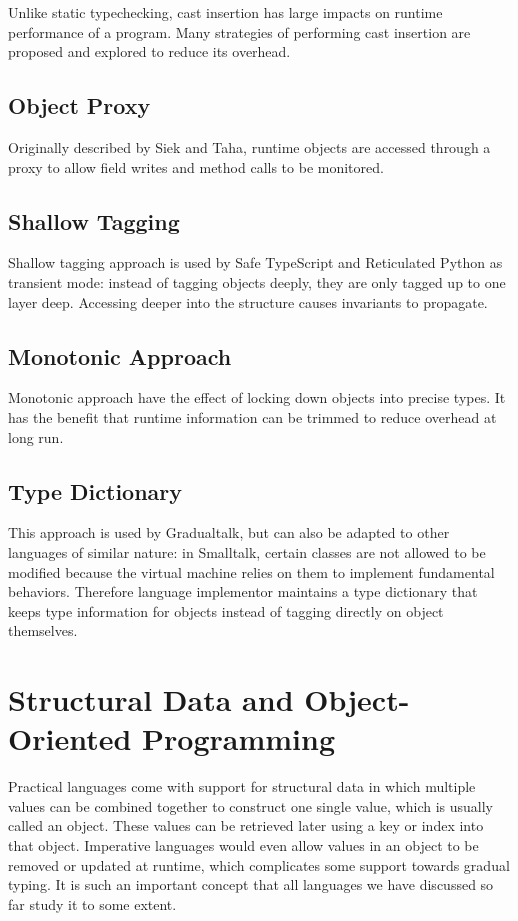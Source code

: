 Unlike static typechecking, cast insertion has large impacts on runtime performance of a program.
Many strategies of performing cast insertion are proposed and explored to reduce its overhead.

\subsection{Object Proxy}

Originally described by Siek and Taha, runtime objects are accessed through a proxy to
allow field writes and method calls to be monitored.

\subsection{Shallow Tagging}

Shallow tagging approach is used by Safe TypeScript and Reticulated Python as transient mode:
instead of tagging objects deeply, they are only tagged up to one layer deep. Accessing deeper 
into the structure causes invariants to propagate.

\subsection{Monotonic Approach}

Monotonic approach have the effect of locking down objects into precise types.
It has the benefit that runtime information can be trimmed to reduce overhead at long run.

\subsection{Type Dictionary}

This approach is used by Gradualtalk, but can also be adapted to other languages of similar nature:
in Smalltalk, certain classes are not allowed to be modified because
the virtual machine relies on them to implement fundamental behaviors.
Therefore language implementor maintains a type dictionary that keeps type information for objects
instead of tagging directly on object themselves.

\section{Structural Data and Object-Oriented Programming}

Practical languages come with support for structural data in which multiple values
can be combined together to construct one single value, which is usually called an object.
These values can be retrieved later using a key or index into that object.
Imperative languages would even allow values in an object to be removed or updated at runtime,
which complicates some support towards gradual typing.
It is such an important concept that all languages we have discussed so far study
it to some extent.

